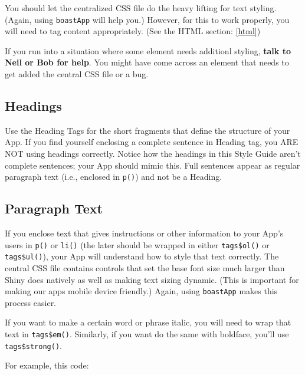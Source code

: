 \documentclass[
]{book}
\newenvironment{Shaded}{\begin{snugshade}}{\end{snugshade}}
\newcommand{\KeywordTok}[1]{\textcolor[rgb]{0.13,0.29,0.53}{\textbf{#1}}}
\newcommand{\NormalTok}[1]{#1}
\newcommand{\OperatorTok}[1]{\textcolor[rgb]{0.81,0.36,0.00}{\textbf{#1}}}
\newcommand{\StringTok}[1]{\textcolor[rgb]{0.31,0.60,0.02}{#1}}
\begin{document}
You should let the centralized CSS file do the heavy lifting for text styling. (Again, using \texttt{boastApp} will help you.) However, for this to work properly, you will need to tag content appropriately. (See the HTML section: \ref{html})

If you run into a situation where some element needs additionl styling, \textbf{talk to Neil or Bob for help}. You might have come across an element that needs to get added the central CSS file or a bug.

\hypertarget{headings}{%
\subsection{Headings}\label{headings}}

Use the Heading Tags for the short fragments that define the structure of your App. If you find yourself enclosing a complete sentence in Heading tag, you ARE NOT using headings correctly. Notice how the headings in this Style Guide aren't complete sentences; your App should mimic this. Full sentences appear as regular paragraph text (i.e., enclosed in \texttt{p()}) and not be a Heading.

\hypertarget{paragraph-text}{%
\subsection{Paragraph Text}\label{paragraph-text}}

If you enclose text that gives instructions or other information to your App's users in \texttt{p()} or \texttt{li()} (the later should be wrapped in either \texttt{tags\$ol()} or \texttt{tags\$ul()}), your App will understand how to style that text correctly. The central CSS file contains controls that set the base font size much larger than Shiny does natively as well as making text sizing dynamic. (This is important for making our apps mobile device friendly.) Again, using \texttt{boastApp} makes this process easier.

If you want to make a certain word or phrase italic, you will need to wrap that text in \texttt{tags\$em()}. Similarly, if you want do the same with boldface, you'll use \texttt{tags\$strong()}.

For example, this code:

\begin{Shaded}
\end{Shaded}
\end{document}
